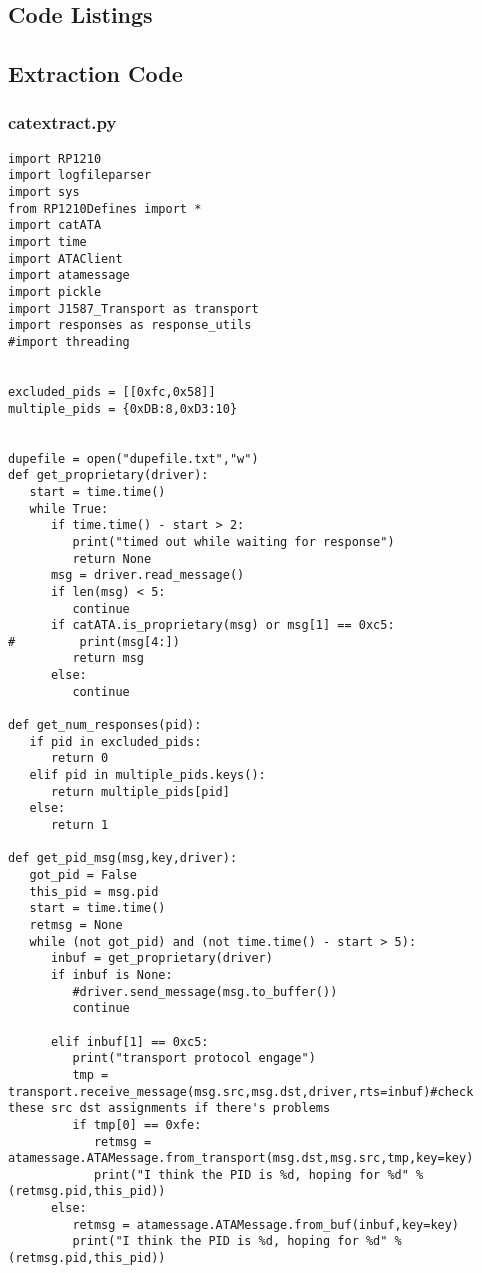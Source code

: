 \begin{appendices}
\chapter{Code Listings}

\section{Extraction Code}

\subsection{catextract.py}\label{app:extraction}
%
\begin{verbatim}
import RP1210
import logfileparser
import sys
from RP1210Defines import *
import catATA
import time
import ATAClient
import atamessage
import pickle
import J1587_Transport as transport
import responses as response_utils
#import threading


excluded_pids = [[0xfc,0x58]]
multiple_pids = {0xDB:8,0xD3:10}


dupefile = open("dupefile.txt","w")
def get_proprietary(driver):
   start = time.time()
   while True:
      if time.time() - start > 2:
         print("timed out while waiting for response")
         return None
      msg = driver.read_message()
      if len(msg) < 5:
         continue
      if catATA.is_proprietary(msg) or msg[1] == 0xc5:
#         print(msg[4:])
         return msg
      else:
         continue

def get_num_responses(pid):
   if pid in excluded_pids:
      return 0
   elif pid in multiple_pids.keys():
      return multiple_pids[pid]
   else:
      return 1

def get_pid_msg(msg,key,driver):
   got_pid = False
   this_pid = msg.pid
   start = time.time()
   retmsg = None
   while (not got_pid) and (not time.time() - start > 5):
      inbuf = get_proprietary(driver)
      if inbuf is None:
         #driver.send_message(msg.to_buffer())
         continue

      elif inbuf[1] == 0xc5:
         print("transport protocol engage")
         tmp = transport.receive_message(msg.src,msg.dst,driver,rts=inbuf)#check these src dst assignments if there's problems
         if tmp[0] == 0xfe:
            retmsg = atamessage.ATAMessage.from_transport(msg.dst,msg.src,tmp,key=key)
            print("I think the PID is %d, hoping for %d" % (retmsg.pid,this_pid))
      else:
         retmsg = atamessage.ATAMessage.from_buf(inbuf,key=key)
         print("I think the PID is %d, hoping for %d" % (retmsg.pid,this_pid))


\end{verbatim}
\end{appendices}
